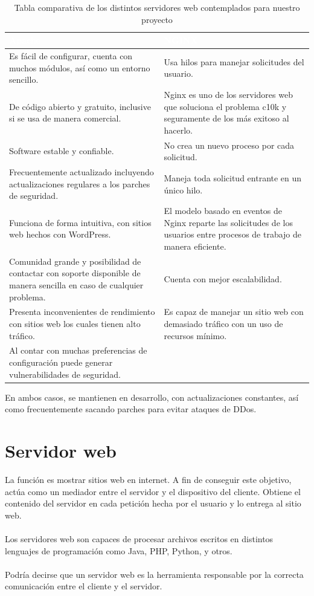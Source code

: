 \documentclass[12pt, a4paper, titlepage]{report}
\begin{document}
		\begin{table}[hbt!]
			\caption[Comparación de servidores web]{Tabla comparativa de los distintos servidores web contemplados para nuestro proyecto}
			\begin{tabular}{|m{7.5cm}|m{7.5cm}|}
				\hline 	
				\rowcolor{guindapoli}
				{\textbf{\textcolor{white}{Apache}}} & {\textbf{\textcolor{white}{NGINX \cite{refNginx}}}}\\
				\hline
				Es fácil de configurar, cuenta con muchos módulos, así como un entorno sencillo. & Usa hilos para manejar solicitudes del usuario.\\
				\hline
				De código abierto y gratuito, inclusive si se usa de manera comercial. & Nginx es uno de los servidores web que soluciona el problema c10k y seguramente de los más exitoso al hacerlo.\\
				\hline
				Software estable y confiable. & No crea un nuevo proceso por cada solicitud.\\
				\hline
				Frecuentemente actualizado incluyendo actualizaciones regulares a los parches de seguridad. & Maneja toda solicitud entrante en un único hilo.\\
				\hline
				Funciona de forma intuitiva, con sitios web hechos con WordPress.  & El modelo basado en eventos de Nginx reparte las solicitudes de los usuarios entre procesos de trabajo de manera eficiente.\\
				\hline
				Comunidad grande y posibilidad de contactar con soporte disponible de manera sencilla en caso de cualquier problema. &  Cuenta con mejor escalabilidad.\\
				\hline
				Presenta inconvenientes de rendimiento con sitios web los cuales tienen alto tráfico. & Es capaz de manejar un sitio web con demasiado tráfico con un uso de recursos mínimo.\\
				\hline
				Al contar con muchas preferencias de configuración puede generar vulnerabilidades de seguridad. & \\
				\hline	
			\end{tabular}
		\end{table}
		En ambos casos, se mantienen en desarrollo, con actualizaciones constantes, así como frecuentemente sacando parches para evitar ataques de DDos.
	    \section{Servidor web}
	        La función es mostrar sitios web en internet. A fin de conseguir este objetivo, actúa como un mediador entre el servidor y el dispositivo del cliente. Obtiene el contenido del servidor en cada petición hecha por el usuario y lo entrega al sitio web.\cite{What_is_a_web_server}\\\\
	        Los servidores web son capaces de procesar archivos escritos en distintos lenguajes de programación como Java, PHP, Python, y otros.\\\\
	        Podría decirse que un servidor web es la herramienta responsable por la correcta comunicación entre el cliente y el servidor.
\end{document}
